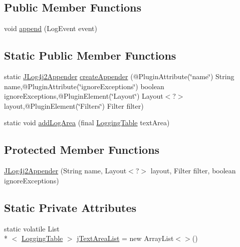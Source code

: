 \subsection*{Public Member Functions}
\begin{DoxyCompactItemize}
\item 
void \hyperlink{classit_1_1emarolab_1_1cagg_1_1debugging_1_1baseComponents_1_1JLog4j2Appender_ac2313f08bafef3ae56fb48dd591e9a91}{append} (Log\-Event event)
\end{DoxyCompactItemize}
\subsection*{Static Public Member Functions}
\begin{DoxyCompactItemize}
\item 
static \hyperlink{classit_1_1emarolab_1_1cagg_1_1debugging_1_1baseComponents_1_1JLog4j2Appender}{J\-Log4j2\-Appender} \hyperlink{classit_1_1emarolab_1_1cagg_1_1debugging_1_1baseComponents_1_1JLog4j2Appender_ab3e7aa4f0ddc592d39740d552b51dfcc}{create\-Appender} (@Plugin\-Attribute(\char`\"{}name\char`\"{}) String name,@Plugin\-Attribute(\char`\"{}ignore\-Exceptions\char`\"{}) boolean ignore\-Exceptions,@Plugin\-Element(\char`\"{}Layout\char`\"{}) Layout$<$?$>$ layout,@Plugin\-Element(\char`\"{}Filters\char`\"{}) Filter filter)
\item 
static void \hyperlink{classit_1_1emarolab_1_1cagg_1_1debugging_1_1baseComponents_1_1JLog4j2Appender_a2473f116af1d6d35b656c0e41d661d70}{add\-Log\-Area} (final \hyperlink{classit_1_1emarolab_1_1cagg_1_1debugging_1_1baseComponents_1_1LoggingTable}{Logging\-Table} text\-Area)
\end{DoxyCompactItemize}
\subsection*{Protected Member Functions}
\begin{DoxyCompactItemize}
\item 
\hyperlink{classit_1_1emarolab_1_1cagg_1_1debugging_1_1baseComponents_1_1JLog4j2Appender_adfe63e4a0bb4b23164b1402a4fac486a}{J\-Log4j2\-Appender} (String name, Layout$<$?$>$ layout, Filter filter, boolean ignore\-Exceptions)
\end{DoxyCompactItemize}
\subsection*{Static Private Attributes}
\begin{DoxyCompactItemize}
\item 
static volatile List\\*
$<$ \hyperlink{classit_1_1emarolab_1_1cagg_1_1debugging_1_1baseComponents_1_1LoggingTable}{Logging\-Table} $>$ \hyperlink{classit_1_1emarolab_1_1cagg_1_1debugging_1_1baseComponents_1_1JLog4j2Appender_ab10353255ee98b1136f25b6a5937d469}{j\-Text\-Area\-List} = new Array\-List$<$$>$()
\end{DoxyCompactItemize}


